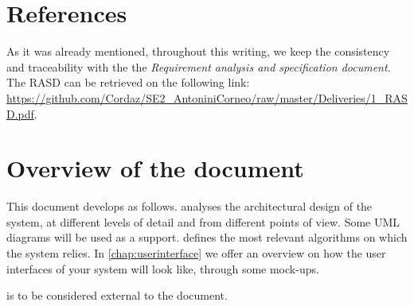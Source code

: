 \section{References}\hypertarget{subsec:references}{}
As it was already mentioned, throughout this writing, we keep the consistency and traceability with the the \emph{Requirement analysis and specification document}. The RASD can be retrieved on the following link: \url{https://github.com/Cordaz/SE2_AntoniniCorneo/raw/master/Deliveries/1_RASD.pdf}.

\section{Overview of the document}	
This document develops as follows.  analyses the architectural design of the system, at different levels of detail and from different points of view. Some UML diagrams will be used as a support.  defines the most relevant algorithms on which the system relies. In \cref{chap:userinterface} we offer an overview on how the user interfaces of your system will look like, through some mock-ups. 

 is to be considered external to the document.

